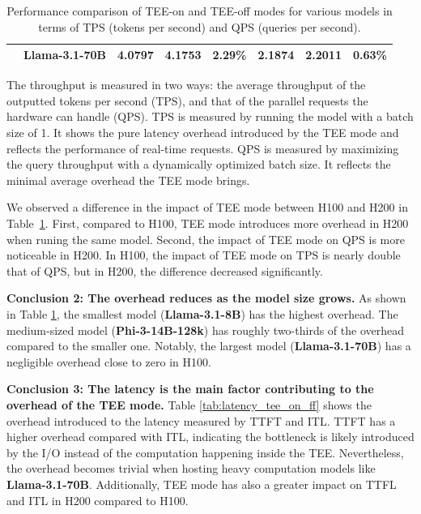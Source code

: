 \documentclass{article}
\begin{document}
\begin{table}[htbp]
\begin{tabular}{llccc|ccc}
        & \textbf{Llama-3.1-70B} & 4.0797                                      & 4.1753                                   & 2.29\%                                                                     & 2.1874          & 2.2011           & 0.63\% \\ 
        \bottomrule
    \end{tabular}
    \caption{Performance comparison of TEE-on and TEE-off modes for various models in terms of TPS (tokens per second) and QPS (queries per second).}
    \label{tab:throughput_tee_on_ff}
\end{table}

The throughput is measured in two ways: the average throughput of the outputted tokens per second (TPS), and that of the parallel requests the hardware can handle (QPS). TPS is measured by running the model with a batch size of 1. It shows the pure latency overhead introduced by the TEE mode and reflects the performance of real-time requests. QPS is measured by maximizing the query throughput with a dynamically optimized batch size. It reflects the minimal average overhead the TEE mode brings.

We observed a difference in the impact of TEE mode between H100 and H200 in Table~\ref{tab:throughput_tee_on_ff}.
First, compared to H100, TEE mode introduces more overhead in H200 when runing the same model.
Second, the impact of TEE mode on QPS is more noticeable in H200.
In H100, the impact of TEE mode on TPS is nearly double that of QPS, but in H200, the difference decreased significantly.

\noindent\textbf{Conclusion 2: The overhead reduces as the model size grows.} As shown in Table \ref{tab:throughput_tee_on_ff}, the smallest model (\textbf{Llama-3.1-8B}) has the highest overhead. The medium-sized model (\textbf{Phi-3-14B-128k}) has roughly two-thirds of the overhead compared to the smaller one. 
Notably, the largest model (\textbf{Llama-3.1-70B}) has a negligible overhead close to zero in H100.

\noindent\textbf{Conclusion 3: The latency is the main factor contributing to the overhead of the TEE mode.} Table \ref{tab:latency_tee_on_ff} shows the overhead introduced to the latency measured by TTFT and ITL. TTFT has a higher overhead compared with ITL, indicating the bottleneck is likely introduced by the I/O instead of the computation happening inside the TEE. Nevertheless, the overhead becomes trivial when hosting heavy computation models like \textbf{Llama-3.1-70B}.
Additionally, TEE mode has also a greater impact on TTFL and ITL in H200 compared to H100.
\end{document}
